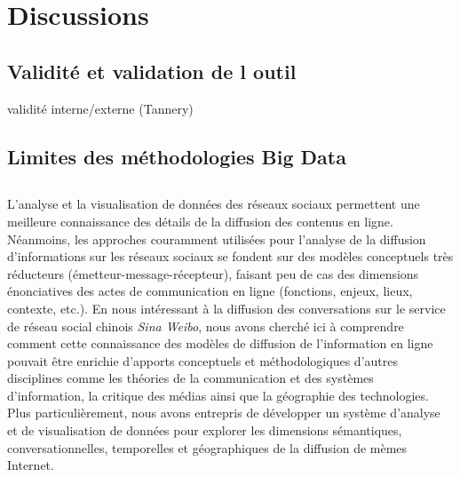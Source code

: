 \section[Discussions]{Discussions}

\subsection[Validité et validation de l outil]{Validité et validation de l outil}

validité interne/externe (Tannery)


\subsection[Limites des méthodologies Big Data]{Limites des méthodologies Big Data}


\subsection[]{}

 

 
L{\textquoteright}analyse et la visualisation de donn\'ees des r\'eseaux  sociaux permettent une meilleure connaissance des d\'etails de la  diffusion des contenus en ligne. N\'eanmoins, les approches couramment  utilis\'ees pour l{\textquoteright}analyse de la diffusion  d{\textquoteright}informations sur les r\'eseaux sociaux se fondent sur  des mod\`eles conceptuels tr\`es r\'educteurs  (\'emetteur-message-r\'ecepteur), faisant peu de cas des dimensions  \'enonciatives des actes de communication en ligne (fonctions, enjeux,  lieux, contexte, etc.). En nous int\'eressant \`a la diffusion des  conversations sur le service de r\'eseau social chinois \textit{Sina  Weibo}, nous avons cherch\'e ici \`a comprendre comment cette  connaissance des mod\`eles de diffusion de  l{\textquoteright}information en ligne pouvait \^etre enrichie  d{\textquoteright}apports conceptuels et m\'ethodologiques  d{\textquoteright}autres disciplines comme les th\'eories de la  communication et des syst\`emes d{\textquoteright}information, la  critique des m\'edias ainsi que la g\'eographie des technologies. Plus  particuli\`erement, nous avons entrepris de d\'evelopper un syst\`eme  d{\textquoteright}analyse et de visualisation de donn\'ees pour  explorer les dimensions s\'emantiques, conversationnelles, temporelles  et g\'eographiques de la diffusion de m\`emes Internet.   
 
